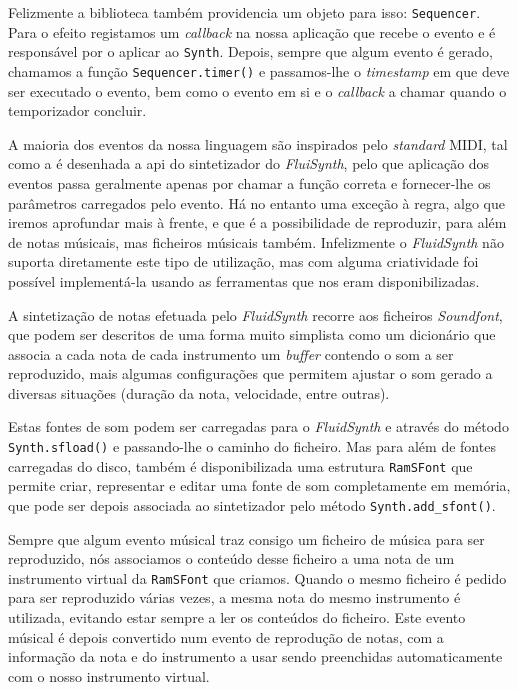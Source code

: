 Felizmente a biblioteca também providencia um objeto para isso: \texttt{Sequencer}.  Para o efeito registamos um \textit{callback} na nossa aplicação que recebe o evento e é responsável por o aplicar ao \texttt{Synth}. Depois, sempre que algum evento é gerado, chamamos a função \texttt{Sequencer.timer()} e passamos-lhe o \textit{timestamp} em que deve ser executado o evento, bem como o evento em si e o \textit{callback} a chamar quando o temporizador concluir.

A maioria dos eventos da nossa linguagem são inspirados pelo \textit{standard} MIDI, tal como a é desenhada a \acrshort{api} do sintetizador do \textit{FluiSynth}, pelo que aplicação dos eventos passa geralmente apenas por chamar a função correta e fornecer-lhe os parâmetros carregados pelo evento. Há no entanto uma exceção à regra, algo que iremos aprofundar mais à frente, e que é a possibilidade de reproduzir, para além de notas músicais, mas ficheiros músicais também. Infelizmente o \textit{FluidSynth} não suporta diretamente este tipo de utilização, mas com alguma criatividade foi possível implementá-la usando as ferramentas que nos eram disponibilizadas.

A sintetização de notas efetuada pelo \textit{FluidSynth} recorre aos ficheiros \textit{Soundfont}, que podem ser descritos de uma forma muito simplista como um dicionário que associa a cada nota de cada instrumento um \textit{buffer} contendo o som a ser reproduzido, mais algumas configurações que permitem ajustar o som gerado a diversas situações (duração da nota, velocidade, entre outras).

Estas fontes de som podem ser carregadas para o \textit{FluidSynth} e através do método \texttt{Synth.sfload()} e passando-lhe o caminho do ficheiro. Mas para além de fontes carregadas do disco, também é disponibilizada uma estrutura \texttt{RamSFont} que permite criar, representar e editar uma fonte de som completamente em memória, que pode ser depois associada ao sintetizador pelo método \texttt{Synth.add\_sfont()}.

Sempre que algum evento músical traz consigo um ficheiro de música para ser reproduzido, nós associamos o conteúdo desse ficheiro a uma nota de um instrumento virtual da \texttt{RamSFont} que criamos. Quando o mesmo ficheiro é pedido para ser reproduzido várias vezes, a mesma nota do mesmo instrumento é utilizada, evitando estar sempre a ler os conteúdos do ficheiro. Este evento músical é depois convertido num evento de reprodução de notas, com a informação da nota e do instrumento a usar sendo preenchidas automaticamente com o nosso instrumento virtual.

